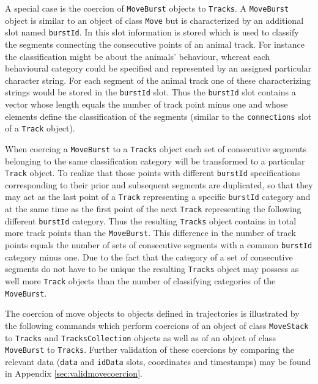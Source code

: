 \documentclass[12pt, oneside, a4paper]{scrbook}
\newcommand{\pkg}[1]{{\normalfont\fontseries{b}\selectfont #1}}
\let\code=\texttt
\begin{document}
\par\medskip


A special case is the coercion of \code{MoveBurst} objects to \code{Tracks}.
A \code{MoveBurst} object is similar to an object of class \code{Move} but is characterized by an additional slot named \code{burstId}. In this slot information is stored which is used to classify the segments connecting the consecutive points of an animal track. 
For instance the classification might be about the animals' behaviour, whereat each behavioural category could be specified and represented by an assigned particular character string. For each segment of the animal track one of these characterizing strings would be stored in the \code{burstId} slot.
Thus the \code{burstId} slot contains a vector whose length equals the number of track point minus one and whose elements define the classification of the segments (similar to the \code{connections} slot of a \code{Track} object).
\par\medskip
When coercing a \code{MoveBurst} to a \code{Tracks} object each set of consecutive segments belonging to the same classification category will be transformed to a particular \code{Track} object. 
To realize that those points with different \code{burstId} specifications corresponding to their prior and subsequent segments are duplicated, so that they may act as the last point of a \code{Track} representing a specific \code{burstId} category and at the same time as the first point of the next \code{Track} representing the following different \code{burstId} category.
Thus the resulting \code{Tracks} object contains in total more track points than the \code{MoveBurst}. This difference in the number of track points equals the number of sets of consecutive segments with a common \code{burstId} category minus one.
Due to the fact that the category of a set of consecutive segments do not have to be unique the resulting \code{Tracks} object may possess as well more \code{Track} objects than the number of classifying categories of the \code{MoveBurst}.

\par\medskip

The coercion of \pkg{move} objects to objects defined in \pkg{trajectories} is illustrated by the following commands which perform coercions of an object of class \code{MoveStack} to \code{Tracks} and \code{TracksCollection} objects as well as of an object of class \code{MoveBurst} to \code{Tracks}. Further validation of these coercions by comparing the relevant data (\code{data} and \code{idData} slots, coordinates and timestamps) may be found in Appendix \ref{sec:validmovecoercion}.
\end{document}
